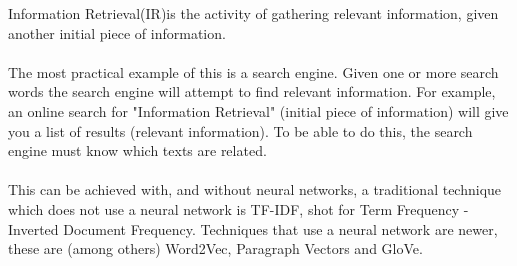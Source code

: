 \documentclass[../../Thesis.tex]{subfiles}
\begin{document}
Information Retrieval(IR)is the activity of gathering relevant information, given another initial piece of information. 
\\\\The most practical example of this is a search engine. Given one or more search words the search engine will attempt to find relevant information. For example, an online search for "Information Retrieval" (initial piece of information) will give you a list of results (relevant information). To be able to do this, the search engine must know which texts are related. \\\\This can be achieved with, and without neural networks, a traditional technique which does not use a neural network is TF-IDF, shot for Term Frequency - Inverted Document Frequency. Techniques that use a neural network are newer, these are (among others) Word2Vec, Paragraph Vectors and GloVe.
\end{document}

